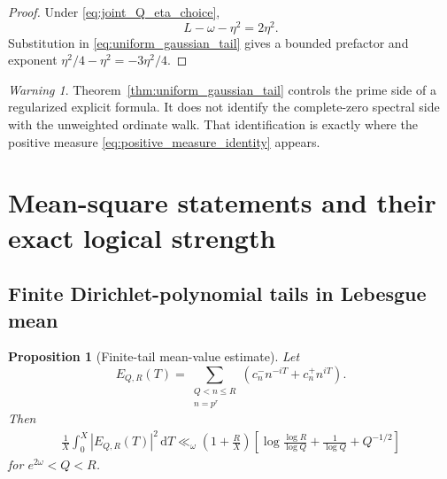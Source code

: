 \documentclass[11pt]{amsart}
\numberwithin{equation}{section}
\theoremstyle{plain}
\newtheorem{proposition}[theorem]{Proposition}
\theoremstyle{definition}
\theoremstyle{remark}
\newtheorem{warning}[theorem]{Warning}
\newcommand{\1}{\mathbf{1}}
\newcommand{\dd}{\,\mathrm{d}}
\begin{document}
\begin{proof}
Under \eqref{eq:joint_Q_eta_choice},
\begin{equation}
L-\omega-\eta^2=2\eta^2.
\label{eq:joint_choice_r}
\end{equation}
Substitution in \eqref{eq:uniform_gaussian_tail} gives a bounded
prefactor and exponent \(\eta^2/4-\eta^2=-3\eta^2/4\).
\end{proof}

\begin{warning}
\label{warn:regularized_tail_not_ordinate_formula}
Theorem~\ref{thm:uniform_gaussian_tail} controls the prime side of a
regularized explicit formula.  It does not identify the complete-zero
spectral side with the unweighted ordinate walk.  That identification is
exactly where the positive measure \eqref{eq:positive_measure_identity}
appears.
\end{warning}

\section{Mean-square statements and their exact logical strength}
\label{sec:mean_square_logic}

\subsection{Finite Dirichlet-polynomial tails in Lebesgue mean}
\label{subsec:finite_dirichlet_mean}

\begin{proposition}[Finite-tail mean-value estimate]
\label{prop:finite_tail_mean_value}
Let
\begin{equation}
E_{Q,R}(T)
=
\sum_{\substack{Q<n\leq R\\n=p^r}}
\left(c_n^-n^{-iT}+c_n^+n^{iT}\right).
\label{eq:finite_tail_ER}
\end{equation}
Then
\begin{align}
\frac1X\int_0^X|E_{Q,R}(T)|^2\dd T
\ll_\omega
\left(1+\frac RX\right)
\left[
\log\frac{\log R}{\log Q}
+
\frac1{\log Q}
+
Q^{-1/2}
\right]
\label{eq:finite_tail_mean_value}
\end{align}
for $e^{2\omega}<Q<R$.
\end{proposition}
\end{document}
